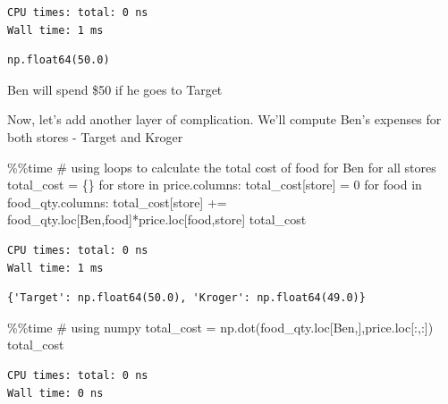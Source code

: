 \documentclass[
  letterpaper,
  DIV=11,
  numbers=noendperiod]{scrreprt}
\newenvironment{Shaded}{\begin{snugshade}}{\end{snugshade}}
\newcommand{\CommentTok}[1]{\textcolor[rgb]{0.37,0.37,0.37}{#1}}
\newcommand{\ControlFlowTok}[1]{\textcolor[rgb]{0.00,0.23,0.31}{#1}}
\newcommand{\DecValTok}[1]{\textcolor[rgb]{0.68,0.00,0.00}{#1}}
\newcommand{\KeywordTok}[1]{\textcolor[rgb]{0.00,0.23,0.31}{#1}}
\newcommand{\NormalTok}[1]{\textcolor[rgb]{0.00,0.23,0.31}{#1}}
\newcommand{\OperatorTok}[1]{\textcolor[rgb]{0.37,0.37,0.37}{#1}}
\newcommand{\StringTok}[1]{\textcolor[rgb]{0.13,0.47,0.30}{#1}}
\begin{document}
\begin{verbatim}
CPU times: total: 0 ns
Wall time: 1 ms
\end{verbatim}

\begin{verbatim}
np.float64(50.0)
\end{verbatim}

Ben will spend \$50 if he goes to Target

Now, let's add another layer of complication. We'll compute Ben's
expenses for both stores - Target and Kroger

\begin{Shaded}
\begin{Highlighting}[]
\OperatorTok{\%\%}\NormalTok{time}
\CommentTok{\# using loops to calculate the total cost of food for Ben for all stores}
\NormalTok{total\_cost }\OperatorTok{=}\NormalTok{ \{\}}
\ControlFlowTok{for}\NormalTok{ store }\KeywordTok{in}\NormalTok{ price.columns:}
\NormalTok{    total\_cost[store] }\OperatorTok{=} \DecValTok{0}
    \ControlFlowTok{for}\NormalTok{ food }\KeywordTok{in}\NormalTok{ food\_qty.columns:}
\NormalTok{        total\_cost[store] }\OperatorTok{+=}\NormalTok{ food\_qty.loc[}\StringTok{\textquotesingle{}Ben\textquotesingle{}}\NormalTok{,food]}\OperatorTok{*}\NormalTok{price.loc[food,store]}
\NormalTok{total\_cost}
\end{Highlighting}
\end{Shaded}

\begin{verbatim}
CPU times: total: 0 ns
Wall time: 1 ms
\end{verbatim}

\begin{verbatim}
{'Target': np.float64(50.0), 'Kroger': np.float64(49.0)}
\end{verbatim}

\begin{Shaded}
\begin{Highlighting}[]
\OperatorTok{\%\%}\NormalTok{time}
\CommentTok{\# using numpy}
\NormalTok{total\_cost }\OperatorTok{=}\NormalTok{ np.dot(food\_qty.loc[}\StringTok{\textquotesingle{}Ben\textquotesingle{}}\NormalTok{,],price.loc[:,:])}
\NormalTok{total\_cost}
\end{Highlighting}
\end{Shaded}

\begin{verbatim}
CPU times: total: 0 ns
Wall time: 0 ns
\end{verbatim}
\end{document}
